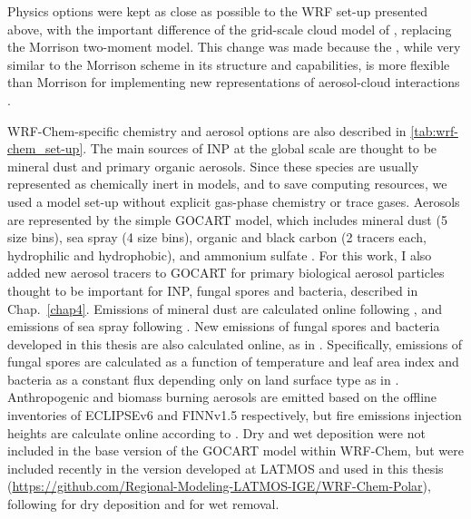     Physics options were kept as close as possible to the WRF set-up presented above, with the important difference of the grid-scale cloud model of \citet{thompson_study_2014}, replacing the Morrison two-moment model. This change was made because the \citet{thompson_study_2014},  while very similar to the Morrison scheme in its structure and capabilities, is more flexible than Morrison for implementing new representations of aerosol-cloud interactions \citep{marelle_aerosol_2025}.

    WRF-Chem-specific chemistry and aerosol options are also described in \cref{tab:wrf-chem_set-up}. %
    The main sources of INP at the global scale are thought to be mineral dust and primary organic aerosols. Since these species are usually represented as chemically inert in models, and to save computing resources, we used a model set-up without explicit gas-phase chemistry or trace gases. Aerosols are represented by the simple GOCART model, which includes mineral dust (5 size bins), sea spray (4 size bins), organic and black carbon (2 tracers each, hydrophilic and hydrophobic), and ammonium sulfate \citep{chin_atmospheric_2000}. For this work, I also added new aerosol tracers to GOCART for primary biological aerosol particles thought to be important for INP, fungal spores and bacteria, described in Chap.~\ref{chap4}.
    Emissions of mineral dust are calculated online following \citet{ginoux_long-term_2004}, and emissions of sea spray following \citet{ioannidis_modelling_2023}.
    New emissions of fungal spores and bacteria developed in this thesis are also calculated online, as in \citet{chatziparaschos_assessing_2025}. Specifically, emissions of fungal spores are calculated as a function of temperature and leaf area index \citep{hummel_regional-scale_2015} and bacteria as a constant flux depending only on land surface type as in \citet{burrows_bacteria_2009}.
    Anthropogenic and biomass burning aerosols are emitted based on the offline inventories of ECLIPSEv6 \citep{klimont_global_2024} and FINNv1.5 \citep{wiedinmyer_global_2014} respectively, but fire emissions injection heights are calculate online according to \citet{freitas_including_2007}.
    Dry and wet deposition were not included in the base version of the GOCART model within WRF-Chem, but were included recently in the version developed at LATMOS and used in this thesis (\url{https://github.com/Regional-Modeling-LATMOS-IGE/WRF-Chem-Polar}), following \citet{emerson_revisiting_2020} for dry deposition and \citet{luo_further_2020} for wet removal.
 
